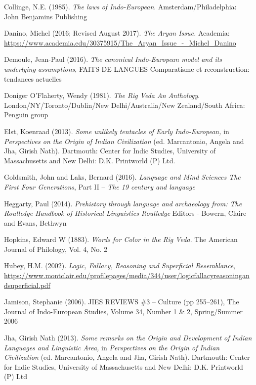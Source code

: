 \begin{thebibliography}{99}
  Collinge, N.E. (1985). \textit{The laws of Indo-European}. Amsterdam/Philadelphia: John Benjamins Publishing

  Danino, Michel (2016; Revised August 2017). \textit{The Aryan Issue.} Academia: \url{https://www.academia.edu/30375915/The_Aryan_Issue_-_Michel_Danino}

  Demoule, Jean-Paul (2016). \textit{The canonical Indo-European model and its underlying assumptions}, FAITS DE LANGUES Comparatisme et reconstruction: tendances actuelles

  Doniger O’Flaherty, Wendy (1981). \textit{The Rig Veda An Anthology}. London/NY/Toronto/Dublin/New Delhi/Australia/New Zealand/South Africa: Penguin group

  Elst, Koenraad (2013). \textit{Some unlikely tentacles of Early Indo-European, }in \textit{Perspectives on the Origin of Indian Civilization }(ed. Marcantonio, Angela and Jha, Girish Nath). Dartmouth: Center for Indic Studies, University of Massachusetts and New Delhi: D.K. Printworld (P) Ltd.

  Goldsmith, John and Laks, Bernard (2016). \textit{Language and Mind Sciences The First Four Generations}, Part II – \textit{The 19 century and language}

  Heggarty, Paul (2014). \textit{Prehistory through language and archaeology from: The Routledge Handbook of Historical Linguistics Routledge} Editors - Bowern, Claire and Evans, Bethwyn 

  Hopkins, Edward W (1883). \textit{Words for Color in the Rig Veda}. The American Journal of Philology, Vol. 4, No. 2

  Hubey, H.M. (2002). \textit{Logic, Fallacy, Reasoning and Superficial Resemblance}, \url{https://www.montclair.edu/profilepages/media/344/user/logicfallacyreasoningandsuperficial.pdf}

  Jamison, Stephanie (2006). JIES REVIEWS \#3 – Culture (pp 255–261), The Journal of Indo-European Studies, Volume 34, Number 1 \& 2, Spring/Summer 2006

  Jha, Girish Nath (2013). \textit{Some remarks on the Origin and Development of Indian Languages and Linguistic Area,} in \textit{Perspectives on the Origin of Indian Civilization} (ed. Marcantonio, Angela and Jha, Girish Nath). Dartmouth: Center for Indic Studies, University of Massachusetts and New Delhi: D.K. Printworld (P) Ltd


\end{thebibliography}
